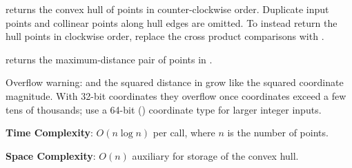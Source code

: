 \begin{compactitem}
  \item {} returns the convex hull of points  in counter-clockwise order. Duplicate input points and collinear points along hull edges are omitted. To instead return the hull points in clockwise order, replace the cross product comparisons  with .
  \item {} returns the maximum-distance pair of points in .
\end{compactitem}

Overflow warning:  and the squared distance in  grow like the squared coordinate magnitude. With 32-bit  coordinates they overflow once coordinates exceed a few tens of thousands; use a 64-bit () coordinate type for larger integer inputs.

\textbf{Time Complexity}: $O(n \log n)$ per call, where $n$ is the number of points.

\textbf{Space Complexity}: $O(n)$ auxiliary for storage of the convex hull.

